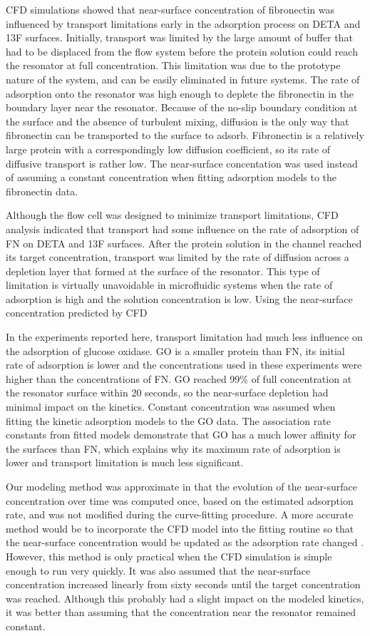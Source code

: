 CFD simulations showed that near-surface concentration of fibronectin
was influenced by transport limitations early in the adsorption process
on DETA and 13F surfaces. Initially, transport was limited by the
large amount of buffer that had to be displaced from the flow system
before the protein solution could reach the resonator at full concentration.
This limitation was due to the prototype nature of the system, and
can be easily eliminated in future systems. The rate of adsorption
onto the resonator was high enough to deplete the fibronectin in the
boundary layer near the resonator. Because of the no-slip boundary
condition at the surface and the absence of turbulent mixing, diffusion
is the only way that fibronectin can be transported to the surface
to adsorb. Fibronectin is a relatively large protein with a correspondingly
low diffusion coefficient, so its rate of diffusive transport is rather
low. The near-surface concentation was used instead of assuming a
constant concentration when fitting adsorption models to the fibronectin
data.

Although the flow cell was designed to minimize transport limitations,
CFD analysis indicated that transport had some influence on the rate
of adsorption of FN on DETA and 13F surfaces. After the protein solution
in the channel reached its target concentration, transport was limited
by the rate of diffusion across a depletion layer that formed at the
surface of the resonator. This type of limitation is virtually unavoidable
in microfluidic systems when the rate of adsorption is high and the
solution concentration is low. Using the near-surface concentration
predicted by CFD 

In the experiments reported here, transport limitation had much less
influence on the adsorption of glucose oxidase. GO is a smaller protein
than FN, its initial rate of adsorption is lower and the concentrations
used in these experiments were higher than the concentrations of FN.
GO reached 99\% of full concentration at the resonator surface within
20 seconds, so the near-surface depletion had minimal impact on the
kinetics. Constant concentration was assumed when fitting the kinetic
adsorption models to the GO data. The association rate constants from
fitted models demonstrate that GO has a much lower affinity for the
surfaces than FN, which explains why its maximum rate of adsorption
is lower and transport limitation is much less significant.

Our modeling method was approximate in that the evolution of the near-surface
concentration over time was computed once, based on the estimated
adsorption rate, and was not modified during the curve-fitting procedure.
A more accurate method would be to incorporate the CFD model into
the fitting routine so that the near-surface concentration would be
updated as the adsorption rate changed \cite{Jenkins2004}. However,
this method is only practical when the CFD simulation is simple enough
to run very quickly. It was also assumed that the near-surface concentration
increased linearly from sixty seconds until the target concentration
was reached. Although this probably had a slight impact on the modeled
kinetics, it was better than assuming that the concentration near
the resonator remained constant.


